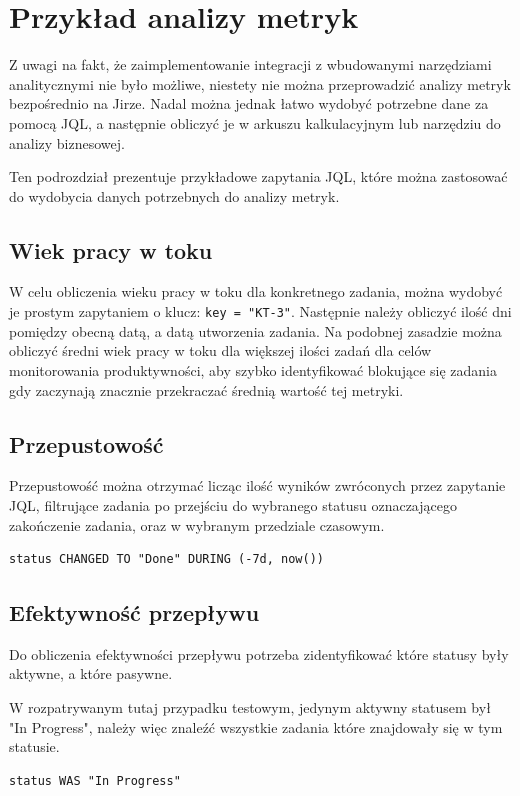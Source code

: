 \section{Przykład analizy metryk}
Z uwagi na fakt, że zaimplementowanie integracji z wbudowanymi narzędziami analitycznymi nie było możliwe, niestety nie można przeprowadzić analizy metryk bezpośrednio na Jirze. Nadal można jednak łatwo wydobyć potrzebne
dane za pomocą JQL, a następnie obliczyć je w arkuszu kalkulacyjnym lub narzędziu do analizy biznesowej.

Ten podrozdział prezentuje przykładowe zapytania JQL, które można zastosować do wydobycia danych potrzebnych do analizy metryk.

\subsection{Wiek pracy w toku}
W celu obliczenia wieku pracy w toku dla konkretnego zadania, można wydobyć je prostym zapytaniem o klucz: \lstinline{key = "KT-3"}.
Następnie należy obliczyć ilość dni pomiędzy obecną datą, a datą utworzenia zadania.
Na podobnej zasadzie można obliczyć średni wiek pracy w toku dla większej ilości zadań dla celów monitorowania produktywności, aby szybko identyfikować blokujące się zadania gdy zaczynają znacznie przekraczać średnią wartość tej metryki.

\subsection{Przepustowość}
Przepustowość można otrzymać licząc ilość wyników zwróconych przez zapytanie JQL, filtrujące zadania po przejściu do wybranego statusu oznaczającego zakończenie zadania, oraz w wybranym przedziale czasowym.
\begin{lstlisting}[caption=Zapytanie JQL pozwalające obliczyć przepustowość w przeciągu ostatniego tygodnia]
status CHANGED TO "Done" DURING (-7d, now())
\end{lstlisting}

\subsection{Efektywność przepływu}
Do obliczenia efektywności przepływu potrzeba zidentyfikować które statusy były aktywne, a które pasywne.

W rozpatrywanym tutaj przypadku testowym, jedynym aktywny statusem był "In Progress", należy więc znaleźć wszystkie zadania które znajdowały się w tym statusie.
\begin{lstlisting}[caption=Zapytanie JQL pozwalające obliczyć efektywność przepływu]
status WAS "In Progress"
\end{lstlisting}

